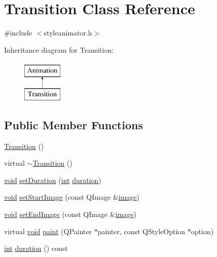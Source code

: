 \hypertarget{class_transition}{\section{Transition Class Reference}
\label{class_transition}
}


{\ttfamily \#include $<$styleanimator.\-h$>$}

Inheritance diagram for Transition\-:\begin{figure}[H]
\begin{center}
\leavevmode
\includegraphics[height=2.000000cm]{class_transition}
\end{center}
\end{figure}
\subsection*{Public Member Functions}
\begin{DoxyCompactItemize}
\item 
\hyperlink{group___core_plugin_ga73b44b2338b11807f77b620a3e810f92}{Transition} ()
\item 
virtual \hyperlink{group___core_plugin_ga2ca526d60e33b0391b4d4bd8c741b84b}{$\sim$\-Transition} ()
\item 
\hyperlink{group___u_a_v_objects_plugin_ga444cf2ff3f0ecbe028adce838d373f5c}{void} \hyperlink{group___core_plugin_gac1ee692f22e664b579cdb9eb71bb1085}{set\-Duration} (\hyperlink{ioapi_8h_a787fa3cf048117ba7123753c1e74fcd6}{int} \hyperlink{group___core_plugin_ga2781139e5618d7a0b897c2888da5c540}{duration})
\item 
\hyperlink{group___u_a_v_objects_plugin_ga444cf2ff3f0ecbe028adce838d373f5c}{void} \hyperlink{group___core_plugin_gae6ddc8589ddb86e4fa856fdf8a6a0502}{set\-Start\-Image} (const Q\-Image \&\hyperlink{glext_8h_a4f252db605f5b9117603096756e79824}{image})
\item 
\hyperlink{group___u_a_v_objects_plugin_ga444cf2ff3f0ecbe028adce838d373f5c}{void} \hyperlink{group___core_plugin_ga818f427a141b261cbfa43618e903c2a1}{set\-End\-Image} (const Q\-Image \&\hyperlink{glext_8h_a4f252db605f5b9117603096756e79824}{image})
\item 
virtual \hyperlink{group___u_a_v_objects_plugin_ga444cf2ff3f0ecbe028adce838d373f5c}{void} \hyperlink{group___core_plugin_ga946927bd34336c171288d0a6460fbbcb}{paint} (Q\-Painter $\ast$painter, const Q\-Style\-Option $\ast$option)
\item 
\hyperlink{ioapi_8h_a787fa3cf048117ba7123753c1e74fcd6}{int} \hyperlink{group___core_plugin_ga2781139e5618d7a0b897c2888da5c540}{duration} () const 
\end{DoxyCompactItemize}
